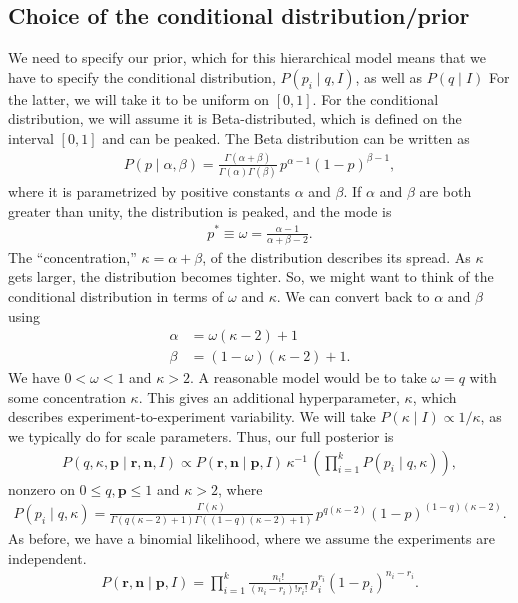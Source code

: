 \subsection{Choice of the conditional distribution/prior}
We need to specify our prior, which for this hierarchical model means
that we have to specify the conditional distribution,
$P(p_i\mid q, I)$, as well as $P(q\mid I)$ For the latter, we will
take it to be uniform on $[0, 1]$.  For the conditional distribution,
we will assume it is Beta-distributed, which is defined on the
interval $[0,1]$ and can be peaked.  The Beta distribution can be
written as
\begin{align}
P(p\mid \alpha, \beta) = \frac{\Gamma(\alpha+\beta)}{\Gamma(\alpha)\Gamma(\beta)}\,
p^{\alpha-1}(1-p)^{\beta-1},
\end{align}
where it is parametrized by positive constants $\alpha$ and $\beta$.
If $\alpha$ and $\beta$ are both greater than unity, the distribution
is peaked, and the mode is
\begin{align}
  p^* \equiv \omega = \frac{\alpha - 1}{\alpha + \beta - 2}.
\end{align}
The ``concentration,'' $\kappa = \alpha + \beta$, of the distribution
describes its spread.  As $\kappa$ gets larger, the distribution
becomes tighter.  So, we might want to think of the conditional
distribution in terms of $\omega$ and $\kappa$.  We can convert back
to $\alpha$ and $\beta$ using
\begin{align}
  \alpha &= \omega(\kappa - 2) + 1 \\
  \beta &= (1-\omega)(\kappa - 2) + 1.
\end{align}
We have $0 < \omega < 1$ and $\kappa > 2$.  A reasonable model would
be to take $\omega = q$ with some concentration $\kappa$.  This gives
an additional hyperparameter, $\kappa$, which describes
experiment-to-experiment variability.  We will take
$P(\kappa\mid I) \propto 1/\kappa$, as we typically do for scale
parameters.  Thus, our full posterior is
\begin{align}
P(q, \kappa,\mathbf{p}\mid \mathbf{r}, \mathbf{n},I) \propto
P(\mathbf{r},\mathbf{n}\mid \mathbf{p}, I)\,
\kappa^{-1}\,\left(\prod_{i=1}^k P(p_i\mid q,\kappa)\right),
\end{align}
nonzero on $0\le q,\mathbf{p} \le 1$ and $\kappa > 2$, where
\begin{align}
P(p_i\mid q, \kappa) =  \frac{\Gamma(\kappa)}{\Gamma(q(\kappa - 2) + 1)\Gamma((1-q)(\kappa - 2) + 1)}\,
p^{q(\kappa - 2)}(1-p)^{(1-q)(\kappa - 2)}.
\end{align}
As before, we have a binomial likelihood, where we assume the
experiments are independent.
\begin{align}
P(\mathbf{r},\mathbf{n}\mid \mathbf{p}, I) = \prod_{i=1}^k \frac{n_i!}{(n_i-r_i)!r_i!}\,
p_i^{r_i}(1-p_i)^{n_i-r_i}.
\end{align}


